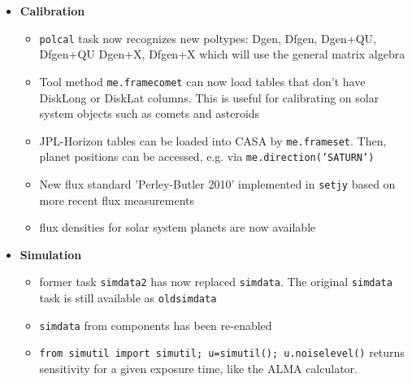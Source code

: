 \begin{itemize}
\item {\bf  Calibration }
\begin{itemize}

   \item {\tt polcal} task now recognizes new
                        poltypes: Dgen, Dfgen, Dgen+QU, Dfgen+QU
                        Dgen+X, Dfgen+X which will use the general
                        matrix algebra

   \item Tool method {\tt me.framecomet} can now load tables that don't have DiskLong or DiskLat columns. This is useful for calibrating on solar system objects such as comets and asteroids 
   \item JPL-Horizon tables can be loaded into CASA by {\tt me.frameset}. Then, planet positions can be accessed, e.g. via {\tt me.direction('SATURN')}
   \item New flux standard 'Perley-Butler 2010' implemented in {\tt setjy} based on more recent flux measurements
   \item flux densities for solar system planets are now available
   \end{itemize}

\item {\bf  Simulation }
  \begin{itemize}
  \item former task {\tt simdata2} has now replaced {\tt simdata}. The original {\tt simdata} task is still available as {\tt oldsimdata}
  \item {\tt simdata} from components has been re-enabled
  \item {\tt from simutil import simutil; u=simutil(); u.noiselevel()} returns sensitivity for a given exposure time, like the ALMA calculator.

\end{itemize}  


\end{itemize}
